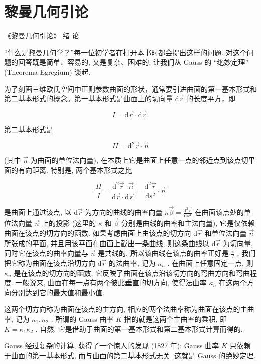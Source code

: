 
\chapter{黎曼几何引论}

 《黎曼几何引论》
 绪 论

“什么是黎曼几何学？”每一位初学者在打开本书时都会提出这样的问题. 对这个问题的回答既是简单、容易的, 又是复杂、困难的. 让我们从 Gauss 的 “绝妙定理” (Theorema Egregium) 谈起.

为了刻画三维欧氏空间中正则参数曲面的形状，通常要引进曲面的第一基本形式和第二基本形式的概念。第一基本形式是曲面上的切向量  $\mathrm{d}\vec{r}$  的长度平方，即

$$
I = \mathrm {d} \vec {r} \cdot \mathrm {d} \vec {r}.
$$

第二基本形式是

$$
I I = \mathrm {d} ^ {2} \vec {r} \cdot \vec {n}
$$

(其中  $\vec{n}$  为曲面的单位法向量), 在本质上它是曲面上任意一点的邻近点到该点切平面的有向距离. 特别是, 两个基本形式之比

$$
\frac {\varPi}{I} = \frac {\mathrm {d} ^ {2} \vec {r} \cdot \vec {n}}{\mathrm {d} \vec {r} \cdot \mathrm {d} \vec {r}} = \frac {\mathrm {d} ^ {2} \vec {r}}{\mathrm {d} s ^ {2}} \cdot \vec {n}
$$

是曲面上通过该点, 以  $\mathrm{d}\vec{r}$  为方向的曲线的曲率向量  $\kappa \vec{\beta} = \frac{\mathrm{d}^2\vec{r}}{\mathrm{d}s^2}$  在曲面该点处的单位法向量  $\vec{n}$  上的投影 (这里的  $\kappa$  和  $\vec{\beta}$  分别是曲线的曲率和主法向量), 它是仅依赖曲面在该点的切方向的函数. 如果考虑曲面上由该点的切方向  $\mathrm{d}\vec{r}$  和单位法向量  $\vec{n}$  所张成的平面, 并且用该平面在曲面上截出一条曲线, 则这条曲线以  $\mathrm{d}\vec{r}$  为切向量, 同时它在该点的曲率向量与  $\vec{n}$  是共线的. 所以该曲线在该点的曲率正好是  $\frac{\pi}{I}$ , 我们把它称为曲面在该点沿切方向  $\mathrm{d}\vec{r}$  的法曲率, 记为  $\kappa_{n}$ . 在曲面上任意固定一点, 则  $\kappa_{n}$  是在该点的切方向的函数, 它反映了曲面在该点沿该切方向的弯曲方向和弯曲程度. 一般说来, 曲面在每一点有两个彼此垂直的切方向, 使得法曲率  $\kappa_{n}$  在这两个方向分别达到它的最大值和最小值.

这两个切方向称为曲面在该点的主方向, 相应的两个法曲率称为曲面在该点的主曲率, 记为  $\kappa_{1}, \kappa_{2}$ . 所谓的 Gauss 曲率  $K$  指的就是这两个主曲率的乘积, 即  $K = \kappa_{1} \kappa_{2}$ . 自然, 它是借助于曲面的第一基本形式和第二基本形式计算而得的.

Gauss 经过复杂的计算, 获得了一个惊人的发现 (1827 年): Gauss 曲率  $K$  只依赖于曲面的第一基本形式, 而与曲面的第二基本形式无关. 这就是 Gauss 的绝妙定理.

